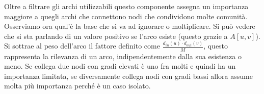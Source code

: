 Oltre a filtrare gli archi utilizzabili questo componente assegna un importanza maggiore a quegli archi che connettono nodi che condividono molte comunità.\\
Osserviamo ora qual'è la base che si va ad ignorare o moltiplicare. Si può vedere che si sta parlando di un valore positivo se l'arco esiste (questo grazie a $\displaystyle A \left[ u,v \right]$). Si sottrae al peso dell'arco il fattore definito come $\displaystyle \frac{ d_{in}\left(u\right) \cdot d_{out}\left(v\right) }{M}$, questo rappresenta la rilevanza di un arco, indipendentemente dalla sua esistenza o meno. Se collega due nodi con gradi elevati è uno fra molti e quindi ha un importanza limitata, se diversamente collega nodi con gradi bassi allora assume molta più importanza perché è un caso isolato.
%
%
%
%
%
%
